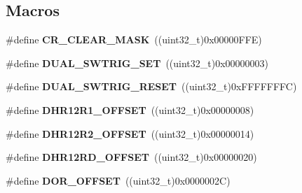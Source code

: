 \subsection*{Macros}
\begin{DoxyCompactItemize}
\item 
\#define {\bfseries C\+R\+\_\+\+C\+L\+E\+A\+R\+\_\+\+M\+A\+SK}~((uint32\+\_\+t)0x00000\+F\+F\+E)\hypertarget{group___d_a_c_ga8a5812a1d5ced986bb997a4bb7ae697d}{}\label{group___d_a_c_ga8a5812a1d5ced986bb997a4bb7ae697d}

\item 
\#define {\bfseries D\+U\+A\+L\+\_\+\+S\+W\+T\+R\+I\+G\+\_\+\+S\+ET}~((uint32\+\_\+t)0x00000003)\hypertarget{group___d_a_c_ga6401668f65168b2b689b49155f380bdd}{}\label{group___d_a_c_ga6401668f65168b2b689b49155f380bdd}

\item 
\#define {\bfseries D\+U\+A\+L\+\_\+\+S\+W\+T\+R\+I\+G\+\_\+\+R\+E\+S\+ET}~((uint32\+\_\+t)0x\+F\+F\+F\+F\+F\+F\+F\+C)\hypertarget{group___d_a_c_gacd3ce00f8b25892532af267f26932ed7}{}\label{group___d_a_c_gacd3ce00f8b25892532af267f26932ed7}

\item 
\#define {\bfseries D\+H\+R12\+R1\+\_\+\+O\+F\+F\+S\+ET}~((uint32\+\_\+t)0x00000008)\hypertarget{group___d_a_c_gaf1305e3b7cfb0f898678baeab6e91cbf}{}\label{group___d_a_c_gaf1305e3b7cfb0f898678baeab6e91cbf}

\item 
\#define {\bfseries D\+H\+R12\+R2\+\_\+\+O\+F\+F\+S\+ET}~((uint32\+\_\+t)0x00000014)\hypertarget{group___d_a_c_ga157b0fbccea090637eea09172fdd6a39}{}\label{group___d_a_c_ga157b0fbccea090637eea09172fdd6a39}

\item 
\#define {\bfseries D\+H\+R12\+R\+D\+\_\+\+O\+F\+F\+S\+ET}~((uint32\+\_\+t)0x00000020)\hypertarget{group___d_a_c_ga2893b0491ec29a95fd061e5e0fa029e3}{}\label{group___d_a_c_ga2893b0491ec29a95fd061e5e0fa029e3}

\item 
\#define {\bfseries D\+O\+R\+\_\+\+O\+F\+F\+S\+ET}~((uint32\+\_\+t)0x0000002\+C)\hypertarget{group___d_a_c_ga051bab7263211bd232d13665339c1745}{}\label{group___d_a_c_ga051bab7263211bd232d13665339c1745}

\end{DoxyCompactItemize}

